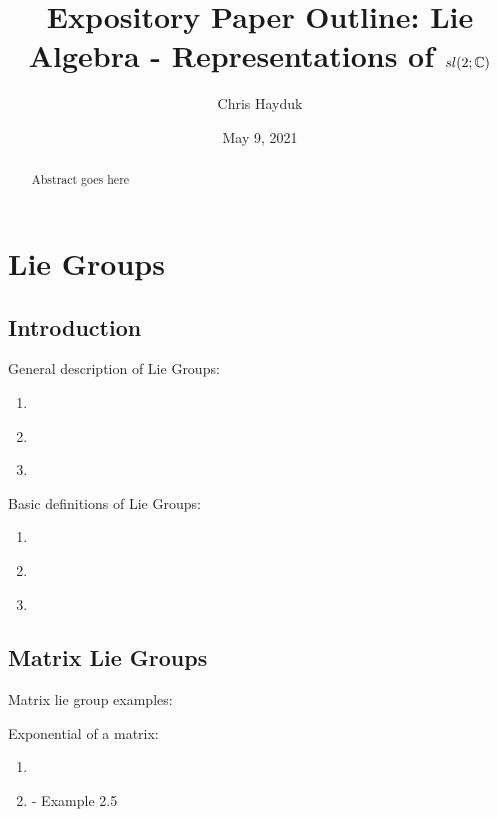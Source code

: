 \documentclass[11pt, a4paper, oneside]{article}
\theoremstyle{plain}
\theoremstyle{definition}
\theoremstyle{example}
\begin{document}
\title{Expository Paper Outline: Lie Algebra - Representations of $sl(2; \mathbb{C})$}
\author{Chris Hayduk}
\date{May 9, 2021}
\maketitle

\begin{abstract}
Abstract goes here
\end{abstract}

\newpage
\section{Lie Groups}

\subsection{Introduction}

General description of Lie Groups: 
\begin{enumerate}
\item \cite{liegroupwiki}

\item \cite[Section 1.1]{stillwell}

\item \cite[Section 1.6]{stillwell}
\end{enumerate}

Basic definitions of Lie Groups:
\begin{enumerate}
\item \cite{liegroupwiki}

\item \cite[Section 1.1]{hall}

\item \cite[Section 1.5]{hall}
\end{enumerate}

\subsection{Matrix Lie Groups}

Matrix lie group examples: \cite[Section 1.2]{hall} 

Exponential of a matrix:
\begin{enumerate}
\item \cite[Section 2.1]{hall}

\item \cite[Section 2.2]{hall} - Example 2.5

\end{enumerate} 
\end{document}
